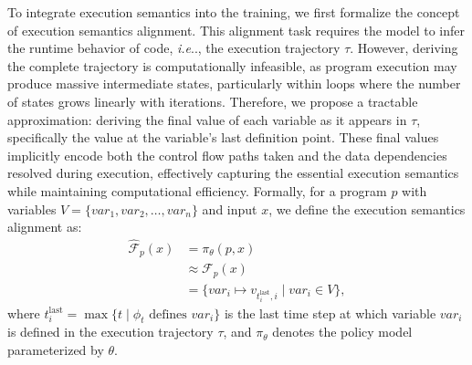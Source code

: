 \documentclass{article}
\makeatletter
\DeclareRobustCommand\onedot{\futurelet\@let@token\@onedot}
\def\@onedot{\ifx\@let@token.\else.\null\fi\xspace}
\def\ie{\emph{i.e}\onedot} \def\Ie{\emph{i.e}\onedot}
\theoremstyle{definition}
\theoremstyle{remark}
\makeatother
\begin{document}
To integrate execution semantics into the training, we first formalize the concept of execution semantics alignment. This alignment task requires the model to infer the runtime behavior of code, \ie, the execution trajectory $\tau$. However, deriving the complete trajectory is computationally infeasible, as program execution may produce massive intermediate states, particularly within loops where the number of states grows linearly with iterations. Therefore, we propose a tractable approximation:  deriving the final value of each variable as it appears in $\tau$, specifically the value at the variable's last definition point. These final values implicitly encode both the control flow paths taken and the data dependencies resolved during execution, effectively capturing the essential execution semantics while maintaining computational efficiency. Formally, for a program $p$ with variables $V = \{var_1, var_2, \ldots, var_n\}$ and input $x$, we define the execution semantics alignment as:
\begin{equation}
\begin{aligned}
\hat{\mathcal{F}}_p(x) & = \pi_\theta(p, x)\\ 
& \approx \mathcal{F}_p(x) \\
&= \{var_i \mapsto v_{t_i^{\text{last}}, i} \mid var_i \in V\},
\end{aligned}
\end{equation}
where $t_i^{\text{last}} = \max\{t \mid \phi_t \text{ defines } var_i\}$ is the last time step at which variable $var_i$ is defined in the execution trajectory $\tau$, and $\pi_\theta$ denotes the policy model parameterized by $\theta$.
\end{document}
